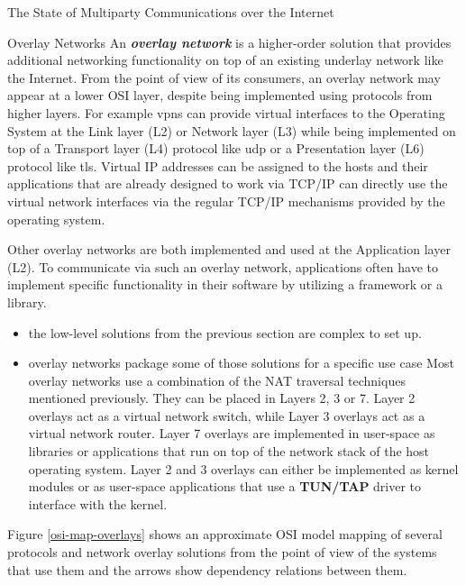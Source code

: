 \begin{frame}[fragile]{The State of Multiparty Communications over the
Internet}
\begin{block}{Overlay Networks}
\protect\hypertarget{sec:overlays}{}
An \textbf{\emph{overlay network}} is a higher-order solution that
provides additional networking functionality on top of an existing
underlay network like the Internet. From the point of view of its
consumers, an overlay network may appear at a lower OSI layer, despite
being implemented using protocols from higher layers. For example
\glspl{vpn} can provide virtual interfaces to the Operating System at
the Link layer (L2) or Network layer (L3) while being implemented on top
of a Transport layer (L4) protocol like \gls{udp} or a Presentation
layer (L6) protocol like \gls{tls}. Virtual IP addresses can be assigned
to the hosts and their applications that are already designed to work
via TCP/IP can directly use the virtual network interfaces via the
regular TCP/IP mechanisms provided by the operating system.

Other overlay networks are both implemented and used at the Application
layer (L2). To communicate via such an overlay network, applications
often have to implement specific functionality in their software by
utilizing a framework or a library.

\begin{itemize}
\tightlist
\item
  the low-level solutions from the previous section are complex to set
  up.
\item
  overlay networks package some of those solutions for a specific use
  case Most overlay networks use a combination of the NAT traversal
  techniques mentioned previously. They can be placed in Layers 2, 3 or
  7. Layer 2 overlays act as a virtual network switch, while Layer 3
  overlays act as a virtual network router. Layer 7 overlays are
  implemented in user-space as libraries or applications that run on top
  of the network stack of the host operating system. Layer 2 and 3
  overlays can either be implemented as kernel modules or as user-space
  applications that use a \textbf{TUN/TAP} 
  driver to interface with the kernel.
\end{itemize}

Figure \ref{osi-map-overlays} shows an approximate OSI model mapping of
several protocols and network overlay solutions from the point of view
of the systems that use them and the arrows show dependency relations
between them.


\end{block}
\end{frame}
